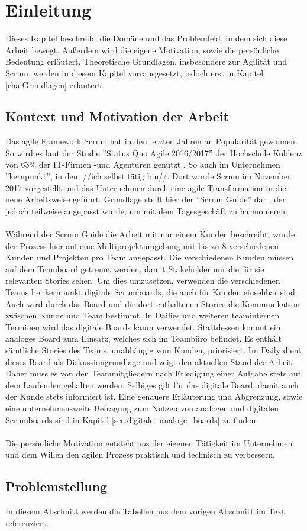 \chapter{Einleitung}
\label{cha:Einleitung}

Dieses Kapitel beschreibt die Domäne und das Problemfeld, in dem sich diese Arbeit bewegt. Außerdem wird die eigene Motivation, sowie die persönliche Bedeutung erläutert. Theoretische Grundlagen, insbesondere zur Agilität und Scrum, werden in diesem Kapitel vorrausgesetzt, jedoch erst in Kapitel \ref{cha:Grundlagen} erläutert.

\section{Kontext und Motivation der Arbeit}
\label{sec:kontext_motivation}
Das agile Framework Scrum hat in den letzten Jahren an Popularität gewonnen. So wird es laut der Studie ''Status Quo Agile 2016/2017'' der Hochschule Koblenz von 63\% der IT-Firmen -und Agenturen genutzt \cite{statusquoagile}. So auch im Unternehmen ''kernpunkt'', in dem //ich selbst tätig bin//. Dort wurde Scrum im November 2017 vorgestellt und das Unternehmen durch eine agile Transformation in die neue Arbeitsweise geführt. Grundlage stellt hier der ''Scrum Guide'' dar \cite{scrumguide}, der jedoch teilweise angepasst wurde, um mit dem Tagesgeschäft zu harmonieren. 
\\ \\
Während der Scrum Guide die Arbeit mit nur einem Kunden beschreibt, wurde der Prozess hier auf eine Multiprojektumgebung mit bis zu 8 verschiedenen Kunden und Projekten pro Team angepasst. Die verschiedenen Kunden müssen auf dem Teamboard getrennt werden, damit Stakeholder nur die für sie relevanten Stories sehen. Um dies umzusetzen, verwenden die verschiedenen Teams bei kernpunkt digitale Scrumboards, die auch für Kunden einsehbar sind. Auch wird durch das Board und die dort enthaltenen Stories die Kommunikation zwischen Kunde und Team bestimmt. In Dailies und weiteren teaminternen Terminen wird das digitale Boards kaum verwendet. Stattdessen kommt ein analoges Board zum Einsatz, welches sich im Teambüro befindet. Es enthält sämtliche Stories des Teams, unabhängig vom Kunden, priorisiert. Im Daily dient dieses Board als Diskussiongrundlage und zeigt den aktuellen Stand der Arbeit. Daher muss es von den Teammitgliedern nach Erledigung einer Aufgabe stets auf dem Laufenden gehalten werden. Selbiges gilt für das digitale Board, damit auch der Kunde stets informiert ist. Eine genauere Erläuterung und Abgrenzung, sowie eine unternehmensweite Befragung zum Nutzen von analogen und digitalen Scrumboards sind in Kapitel \ref{sec:digitale_analoge_boards} zu finden.
\\ \\
Die persönliche Motivation entsteht aus der eigenen Tätigkeit im Unternehmen und dem Willen den agilen Prozess praktisch und technisch zu verbessern.

\section{Problemstellung}
\label{sec:problemstellung}
In diesem Abschnitt werden die Tabellen aus dem vorigen Abschnitt im Text referenziert. 




